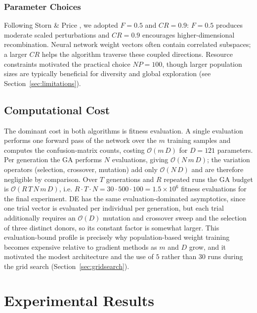 \documentclass[12pt, a4paper]{article}
\begin{document}
\subsubsection{Parameter Choices}
\label{sec:de_params}
Following Storn \& Price \cite{storn1997}, we adopted $F=0.5$ and $CR=0.9$: $F=0.5$ produces moderate scaled perturbations and $CR=0.9$ encourages higher-dimensional recombination. Neural network weight vectors often contain correlated subspaces; a larger $CR$ helps the algorithm traverse these coupled directions. Resource constraints motivated the practical choice $NP=100$, though larger population sizes are typically beneficial for diversity and global exploration (see Section~\ref{sec:limitations}).

\subsection{Computational Cost}
The dominant cost in both algorithms is fitness evaluation. A single evaluation performs one forward pass of the network over the $m$ training samples and computes the confusion-matrix counts, costing $\mathcal{O}(m\,D)$ for $D=121$ parameters. Per generation the GA performs $N$ evaluations, giving $\mathcal{O}(N\,m\,D)$; the variation operators (selection, crossover, mutation) add only $\mathcal{O}(N\,D)$ and are therefore negligible by comparison. Over $T$ generations and $R$ repeated runs the GA budget is $\mathcal{O}(R\,T\,N\,m\,D)$, i.e. $R\cdot T\cdot N = 30\cdot 500\cdot 100 = 1.5\times10^{6}$ fitness evaluations for the final experiment. DE has the same evaluation-dominated asymptotics, since one trial vector is evaluated per individual per generation, but each trial additionally requires an $\mathcal{O}(D)$ mutation and crossover sweep and the selection of three distinct donors, so its constant factor is somewhat larger. This evaluation-bound profile is precisely why population-based weight training becomes expensive relative to gradient methods as $m$ and $D$ grow, and it motivated the modest architecture and the use of $5$ rather than $30$ runs during the grid search (Section~\ref{sec:gridsearch}).

\section{Experimental Results}
\end{document}
